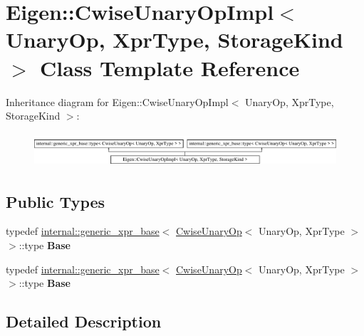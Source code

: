 \hypertarget{class_eigen_1_1_cwise_unary_op_impl}{}\section{Eigen\+:\+:Cwise\+Unary\+Op\+Impl$<$ Unary\+Op, Xpr\+Type, Storage\+Kind $>$ Class Template Reference}
\label{class_eigen_1_1_cwise_unary_op_impl}
Inheritance diagram for Eigen\+:\+:Cwise\+Unary\+Op\+Impl$<$ Unary\+Op, Xpr\+Type, Storage\+Kind $>$\+:\begin{figure}[H]
\begin{center}
\leavevmode
\includegraphics[height=1.266968cm]{class_eigen_1_1_cwise_unary_op_impl}
\end{center}
\end{figure}
\subsection*{Public Types}
\begin{DoxyCompactItemize}
\item 
\mbox{\label{class_eigen_1_1_cwise_unary_op_impl_a79822924cef6e029d7e25cb05c3c3e6f}} 
typedef \hyperlink{struct_eigen_1_1internal_1_1generic__xpr__base}{internal\+::generic\+\_\+xpr\+\_\+base}$<$ \hyperlink{group___core___module_class_eigen_1_1_cwise_unary_op}{Cwise\+Unary\+Op}$<$ Unary\+Op, Xpr\+Type $>$ $>$\+::type {\bfseries Base}
\item 
\mbox{\label{class_eigen_1_1_cwise_unary_op_impl_a79822924cef6e029d7e25cb05c3c3e6f}} 
typedef \hyperlink{struct_eigen_1_1internal_1_1generic__xpr__base}{internal\+::generic\+\_\+xpr\+\_\+base}$<$ \hyperlink{group___core___module_class_eigen_1_1_cwise_unary_op}{Cwise\+Unary\+Op}$<$ Unary\+Op, Xpr\+Type $>$ $>$\+::type {\bfseries Base}
\end{DoxyCompactItemize}


\subsection{Detailed Description}
